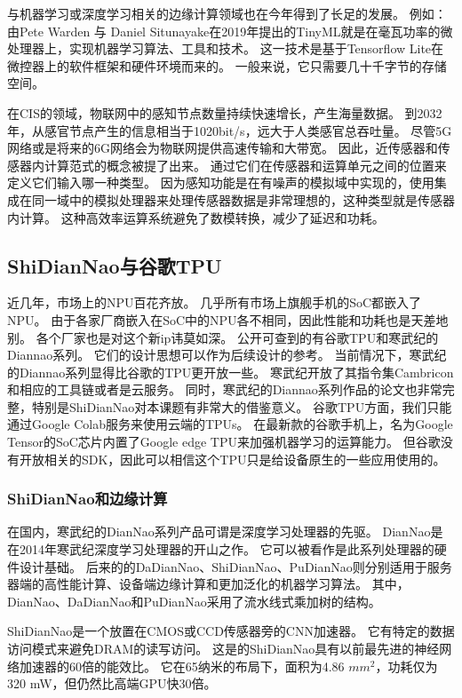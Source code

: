 与机器学习或深度学习相关的边缘计算领域也在今年得到了长足的发展。
例如：由Pete Warden 与 Daniel Situnayake在2019年提出的TinyML就是在毫瓦功率的微处理器上，实现机器学习算法、工具和技术。
这一技术是基于Tensorflow Lite在微控器上的软件框架和硬件环境而来的。
一般来说，它只需要几十千字节的存储空间。  

在CIS的领域，物联网中的感知节点数量持续快速增长，产生海量数据。
到2032年，从感官节点产生的信息相当于1020bit/s，远大于人类感官总吞吐量。
尽管5G网络或是将来的6G网络会为物联网提供高速传输和大带宽。
因此，近传感器和传感器内计算范式的概念被提了出来。
通过它们在传感器和运算单元之间的位置来定义它们输入哪一种类型。
因为感知功能是在有噪声的模拟域中实现的，使用集成在同一域中的模拟处理器来处理传感器数据是非常理想的，这种类型就是传感器内计算。
这种高效率运算系统避免了数模转换，减少了延迟和功耗。


\subsection{ShiDianNao与谷歌TPU}
近几年，市场上的NPU百花齐放。
几乎所有市场上旗舰手机的SoC都嵌入了NPU。
由于各家厂商嵌入在SoC中的NPU各不相同，因此性能和功耗也是天差地别。
各个厂家也是对这个新ip讳莫如深。
公开可查到的有谷歌TPU和寒武纪的Diannao系列。
它们的设计思想可以作为后续设计的参考。
当前情况下，寒武纪的Diannao系列显得比谷歌的TPU更开放一些。
寒武纪开放了其指令集Cambricon和相应的工具链或者是云服务。
同时，寒武纪的Diannao系列作品的论文也非常完整，特别是ShiDianNao对本课题有非常大的借鉴意义。
谷歌TPU方面，我们只能通过Google Colab服务来使用云端的TPUs。
在最新款的谷歌手机上，名为Google Tensor的SoC芯片内置了Google edge TPU来加强机器学习的运算能力。
但谷歌没有开放相关的SDK，因此可以相信这个TPU只是给设备原生的一些应用使用的。


\subsubsection{ShiDianNao和边缘计算}
在国内，寒武纪的DianNao系列产品可谓是深度学习处理器的先驱。
DianNao是在2014年寒武纪深度学习处理器的开山之作。
它可以被看作是此系列处理器的硬件设计基础。
后来的的DaDianNao、ShiDianNao、PuDianNao则分别适用于服务器端的高性能计算、设备端边缘计算和更加泛化的机器学习算法。
其中，DianNao、DaDianNao和PuDianNao采用了流水线式乘加树的结构。  %


ShiDianNao是一个放置在CMOS或CCD传感器旁的CNN加速器。
它有特定的数据访问模式来避免DRAM的读写访问。
这是的ShiDianNao具有以前最先进的神经网络加速器的60倍的能效比。
它在65纳米的布局下，面积为4.86 $mm^2$，功耗仅为320 mW，但仍然比高端GPU快30倍。

